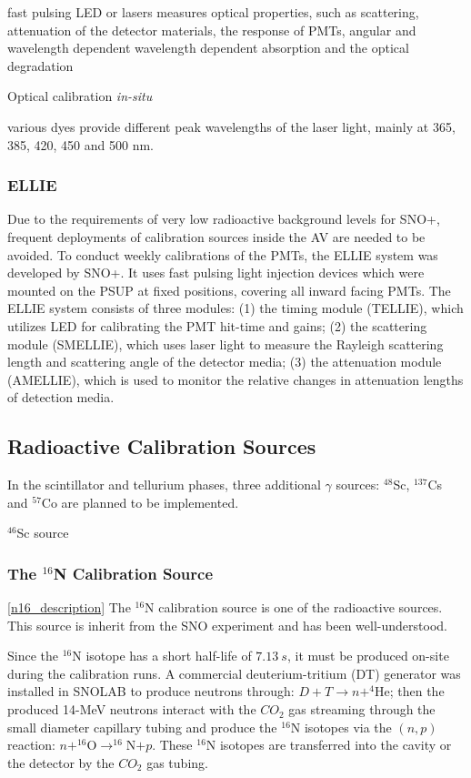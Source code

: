 fast pulsing LED or lasers
measures optical properties, such as scattering, attenuation of the detector materials, the response of PMTs, 
angular and wavelength dependent
wavelength dependent absorption and the optical degradation

Optical calibration {\emph {in-situ}} 

various dyes provide different peak wavelengths of the laser light, mainly at 365, 385, 420, 450 and 500 nm.

\subsubsection{ELLIE}
Due to the requirements of very low radioactive background levels for SNO+, frequent deployments of calibration sources inside the AV are needed to be avoided. To conduct weekly calibrations of the PMTs, the ELLIE system was developed by SNO+. It uses fast pulsing light injection devices which were mounted on the PSUP at fixed positions, covering all inward facing PMTs. The ELLIE system consists of three modules: (1) the timing module (TELLIE), which utilizes LED for calibrating the PMT hit-time and gains; (2) the scattering module (SMELLIE), which uses laser light to measure the Rayleigh scattering length and scattering angle of the detector media; (3) the attenuation module (AMELLIE), which is used to monitor the relative changes in attenuation lengths of detection media\cite{jones2011background,walker2016study,dunger2018topological,snop_jinst}.

\subsection{Radioactive Calibration Sources}
In the scintillator and tellurium phases, three additional $\gamma$ sources: $^{48}$Sc, $^{137}$Cs and $^{57}$Co are planned to be implemented.

$^{46}$Sc source

\subsubsection{The $^{16}$N Calibration Source}\ref{n16_description}
The $^{16}$N calibration source is one of the radioactive sources. This source is inherit from the SNO experiment and has been well-understood\cite{dragowsky1999sudbury,dragowsky200216n,hamer2001energy}.   

Since the $^{16}$N isotope has a short half-life of $7.13~s$, it must be produced on-site during the calibration runs. A commercial deuterium-tritium (DT) generator was installed in SNOLAB to produce neutrons through: $D+T\to n+^{4}$He; then the produced 14-MeV neutrons interact with the $CO_2$ gas streaming through the small diameter capillary tubing and produce the $^{16}$N isotopes via the $(n,p)$ reaction: $n+^{16}$O$\to^{16}$N$+p$. These $^{16}$N isotopes are transferred into the cavity or the detector by the $CO_2$ gas tubing\cite{dragowsky200216n}.  

